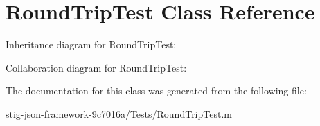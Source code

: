 \hypertarget{interface_round_trip_test}{
\section{\-Round\-Trip\-Test \-Class \-Reference}
\label{interface_round_trip_test}
}


\-Inheritance diagram for \-Round\-Trip\-Test\-:


\-Collaboration diagram for \-Round\-Trip\-Test\-:


\-The documentation for this class was generated from the following file\-:\begin{DoxyCompactItemize}
\item 
stig-\/json-\/framework-\/9c7016a/\-Tests/\-Round\-Trip\-Test.\-m\end{DoxyCompactItemize}
